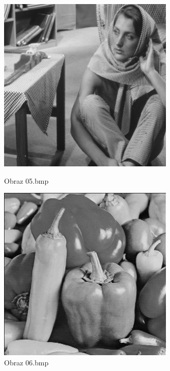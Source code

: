 \documentclass[../EDI_Task4_Karwowski_Kowalewski.tex]{subfiles}
\begin{document}
{    \begin{figure}[!htbp]
        \begin{minipage}[c]{0.49\linewidth}
            \centering
            \includegraphics[width=0.75\textwidth]{img/original/05.png}
            \caption{Obraz 05.bmp}
        \end{minipage}\hfill
        \begin{minipage}[c]{0.49\linewidth}
            \centering
            \includegraphics[width=0.75\textwidth]{img/original/06.png}
            \caption{Obraz 06.bmp}
        \end{minipage}
    \end{figure}

}
\end{document}
